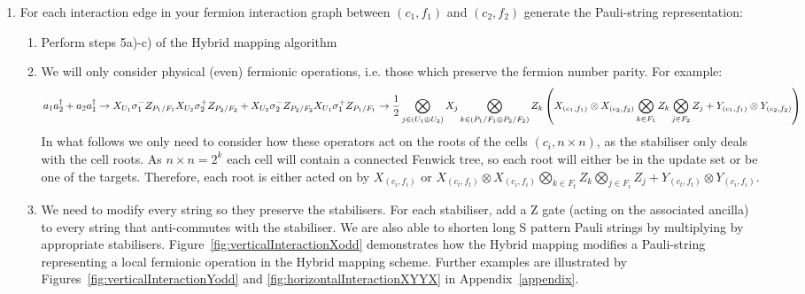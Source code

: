 \begin{enumerate}
\begin{enumerate}
\begin{figure}
    \end{figure}
    \\\\This technique exploits the newly created stabiliser of the previously entangled ancilla to cancel out most of the gates required to entangle the next ancilla in the row.
    \end{enumerate}
    \item For each interaction edge in your fermion interaction graph between $(c_1, f_1)$ and $(c_2, f_2)$ generate the Pauli-string representation:
    \begin{enumerate}
        \item Perform steps 5a)-c) of the Hybrid mapping algorithm
        \item We will only consider physical (even) fermionic operations, i.e. those which preserve the fermion number parity. For example:
        \begin{dmath*}
                    a_1a^{\dagger}_2 +a_2a^{\dagger}_1  \rightarrow X_{U_1}  \sigma^-_1  Z_{P_1/F_1}  X_{U_2}  \sigma^+_2Z_{P_2/F_2} +  X_{U_2}  \sigma^-_2  Z_{P_2/F_2}  X_{U_1}  \sigma^+_1Z_{P_1/F_1}
                    \rightarrow \frac{1}{2}\bigotimes_{j \in (U_1 \oplus U_2)} X_j \bigotimes_{k \in (P_1/F_1 \oplus P_2/F_2)} Z_k \> \\ \left( X_{(c_1, f_1)} \otimes X_{(c_2, f_2)} \bigotimes_{k \in F_1} Z_k \bigotimes_{j \in F_2} Z_j  + Y_{(c_1, f_1)}  \otimes Y_{(c_2, f_2)} \right) 
            \end{dmath*}
        In what follows we only need to consider how these operators act on the roots of the cells $(c_i, n\times n)$, as the stabiliser only deals with the cell roots. As $n\times n = 2^k$ each cell will contain a connected Fenwick tree, so each root will either be in the update set or be one of the targets. Therefore, each root is either acted on by $X_{(c_i, f_i)} $ or $X_{(c_t, f_t)} \otimes X_{(c_i, f_i)} \bigotimes_{k \in F_t} Z_k \bigotimes_{j \in F_i} Z_j  + Y_{(c_t, f_t)}  \otimes Y_{(c_i, f_i)} $. 
        \item We need to modify every string so they preserve the stabilisers. For each stabiliser, add a Z gate (acting on the associated ancilla) to every string that anti-commutes with the stabiliser. We are also able to shorten long S pattern Pauli strings by multiplying by appropriate stabilisers. Figure~\ref{fig:verticalInteractionXodd} demonstrates how the Hybrid\+ mapping modifies a Pauli-string representing a local fermionic operation in the Hybrid mapping scheme. Further examples are illustrated by Figures~\ref{fig:verticalInteractionYodd} and \ref{fig:horizontalInteractionXYYX} in Appendix~\ref{appendix}.\\\\

\end{enumerate}
\end{enumerate}
